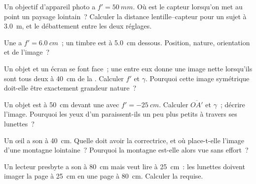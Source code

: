 \begin{exercise}[$\star\star$]\label{exo:g11:lenses-and-eye:6}
Un objectif d'appareil photo a $f' = \qty{50}{mm}$. Où est le capteur
lorsqu'on met au point un paysage lointain~? Calculer la distance
lentille--capteur pour un sujet à \qty{3.0}{m}, et le débattement entre
les deux réglages.
\end{exercise}

\begin{exercise}[$\star\star$]\label{exo:g11:lenses-and-eye:7}
Une  a $f' = \qty{6.0}{cm}$~; un timbre est à
\qty{5.0}{cm} dessous. Position, nature, orientation et
 de l'image~?
\end{exercise}

\begin{exercise}[$\star\star$]\label{exo:g11:lenses-and-eye:8}
Un objet et un écran se font face~; une
 entre eux donne une image nette
lorsqu'ils sont tous deux à \qty{40}{cm} de la
. Calculer $f'$ et $\gamma$. Pourquoi cette image
symétrique doit-elle être exactement grandeur nature~?
\end{exercise}

\begin{exercise}[$\star\star$]\label{exo:g11:lenses-and-eye:9}
Un objet est à \qty{50}{cm} devant une
 avec $f' = \qty{-25}{cm}$. Calculer
$\overline{OA'}$ et $\gamma$~; décrire l'image. Pourquoi les yeux d'un
 paraissent-ils un peu plus petits à travers ses lunettes~?
\end{exercise}

\begin{exercise}[$\star\star$]\label{exo:g11:lenses-and-eye:10}
Un œil  a son
 à \qty{40}{cm}. Quelle
 doit avoir la
 correctrice, et où place-t-elle l'image d'une
montagne lointaine~? Pourquoi la montagne est-elle alors vue sans effort~?
\end{exercise}

\begin{exercise}[$\star\star$]\label{exo:g11:lenses-and-eye:11}
Un lecteur presbyte a son  à
\qty{80}{cm} mais veut lire à \qty{25}{cm}~: les lunettes doivent
imager la page à \qty{25}{cm} en une page
 à \qty{80}{cm}. Calculer la
 requise.
\end{exercise}

